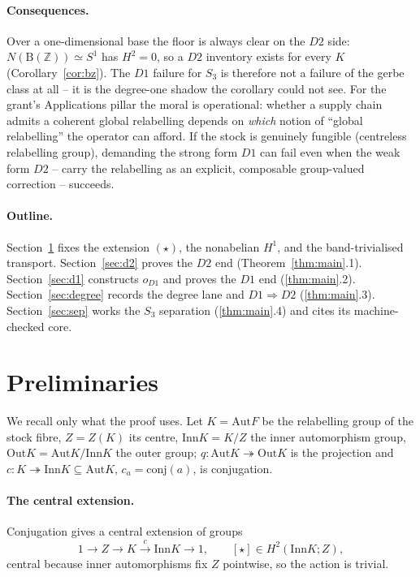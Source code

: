 \documentclass[11pt]{article}
\theoremstyle{definition}
\newcommand{\Z}{\mathbb{Z}}
\newcommand{\Aut}{\mathrm{Aut}}
\newcommand{\Inn}{\mathrm{Inn}}
\newcommand{\Out}{\mathrm{Out}}
\newcommand{\B}{\mathrm{B}}
\begin{document}
\paragraph{Consequences.} Over a one-dimensional base the floor is always clear on the
$D2$ side: $N(\B(\Z))\simeq S^1$ has $H^2=0$, so a $D2$ inventory exists for every $K$
(Corollary~\ref{cor:bz}). The $D1$ failure for $S_3$ is therefore not a failure of the
gerbe class at all -- it is the degree-one shadow the corollary could not see. For the
grant's Applications pillar the moral is operational: whether a supply chain admits a
coherent global relabelling depends on \emph{which} notion of ``global relabelling'' the
operator can afford. If the stock is genuinely fungible (centreless relabelling group),
demanding the strong form $D1$ can fail even when the weak form $D2$ -- carry the
relabelling as an explicit, composable group-valued correction -- succeeds.

\paragraph{Outline.} Section~\ref{sec:prelim} fixes the extension $(\star)$, the nonabelian
$H^1$, and the band-trivialised transport. Section~\ref{sec:d2} proves the $D2$ end
(Theorem~\ref{thm:main}.1). Section~\ref{sec:d1} constructs $o_{D1}$ and proves the $D1$
end (\ref{thm:main}.2). Section~\ref{sec:degree} records the degree lane and
$D1\Rightarrow D2$ (\ref{thm:main}.3). Section~\ref{sec:sep} works the $S_3$ separation
(\ref{thm:main}.4) and cites its machine-checked core.

\section{Preliminaries}\label{sec:prelim}

We recall only what the proof uses. Let $K=\Aut F$ be the relabelling group of the stock
fibre, $Z=Z(K)$ its centre, $\Inn K=K/Z$ the inner automorphism group, $\Out K=\Aut
K/\Inn K$ the outer group; $q\colon\Aut K\twoheadrightarrow\Out K$ is the projection and
$c\colon K\twoheadrightarrow\Inn K\subseteq\Aut K$, $c_a=\mathrm{conj}(a)$, is conjugation.

\paragraph{The central extension.} Conjugation gives a central extension of groups
\begin{equation}\tag{$\star$}\label{eq:star}
1\longrightarrow Z\longrightarrow K\xrightarrow{\ c\ }\Inn K\longrightarrow 1,
\qquad [\star]\in H^2(\Inn K;Z),
\end{equation}
central because inner automorphisms fix $Z$ pointwise, so the action is trivial.
\end{document}
